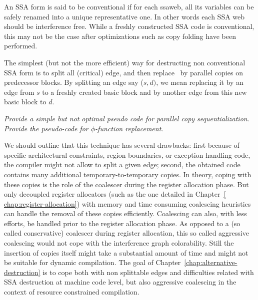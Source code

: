 {An SSA form is said to be conventional if for each ssaweb, all its variables can be safely renamed into a unique representative one. In other words each SSA web should be interference free. While a freshly constructed SSA code is conventional, this may not be the case after optimizations such as copy folding have been performed.

The simplest (but not the more efficient) way for destructing non conventional SSA form is to split all (critical) edge, and then replace \phiops\ by parallel copies on predecessor blocks. By splitting an edge say ($s,d)$, we mean replacing it by an edge from $s$ to a freshly created basic block and by another edge from this new basic block to $d$.

{\em Provide a simple but not optimal pseudo code for parallel copy sequentialization. Provide the pseudo-code for $\phi$-function replacement.}

We should outline that this technique has several drawbacks: first because of specific architectural constraints, region boundaries, or exception handling code, the compiler might not allow to split a given edge; second, the obtained code contains many additional temporary-to-temporary copies. In theory, coping with these copies is the role of the coalescer during the register allocation phase. But only decoupled register allocators (such as the one detailed in Chapter~\ref{ chap:register-allocation}) with memory and time consuming coalescing heuristics can handle the removal of these copies efficiently. Coalescing can also, with less efforts, be handled prior to the register allocation phase. As opposed to a (so called conservative) coalescer during register allocation, this so called aggressive coalescing would not cope with the interference graph colorability. Still the insertion of copies itself might take a substantial amount of time and might not be suitable for dynamic compilation. The goal of Chapter~\ref{chap:alternative-destruction} is to cope both with non splittable edges and difficulties related with SSA destruction at machine code level, but also aggressive coalescing in the context of resource constrained compilation.

}
